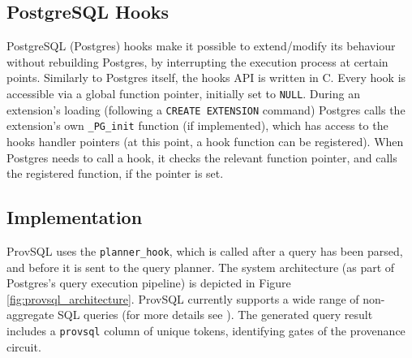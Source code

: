 \subsection{PostgreSQL Hooks} PostgreSQL (Postgres) hooks \cite{postgre_hooks} make it possible to extend/modify its behaviour without rebuilding Postgres, by interrupting the execution process at certain points. Similarly to Postgres itself, the hooks API is written in C. Every hook is accessible via a global function pointer, initially set to \texttt{NULL}. During an extension's loading (following a \texttt{CREATE EXTENSION} command) Postgres calls the extension's own \texttt{\_PG\_init} function (if implemented), which has access to the hooks handler pointers (at this point, a hook function can be registered). When Postgres needs to call a hook, it checks the relevant function pointer, and calls the registered function, if the pointer is set.

\subsection{Implementation} ProvSQL \cite{provsql_github} uses the \texttt{planner\_hook}, which is called after a query has been parsed, and before it is sent to the query planner. The system architecture (as part of Postgres's query execution pipeline) is depicted in Figure \ref{fig:provsql_architecture}.
ProvSQL currently supports a wide range of non-aggregate SQL queries (for more details see \cite{provsql_github, Senellart2018}). The generated query result includes a \texttt{provsql} column of unique\footnotemark
{}
tokens, identifying gates of the provenance circuit.

